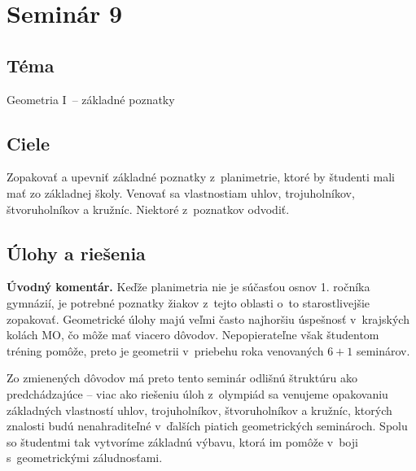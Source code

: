 \section*{Seminár 9}


\subsection*{Téma}
Geometria I~-- základné poznatky
\subsection*{Ciele}
Zopakovať a upevniť základné poznatky z~planimetrie, ktoré by študenti mali mať zo základnej školy. Venovať sa vlastnostiam uhlov, trojuholníkov, štvoruholníkov a kružníc. Niektoré z~poznatkov odvodiť.

\subsection*{Úlohy a riešenia}
\textbf{Úvodný komentár.} Keďže planimetria nie je súčasťou osnov 1. ročníka gymnázií, je potrebné poznatky žiakov z~tejto oblasti o~to starostlivejšie zopakovať. Geometrické úlohy majú veľmi často najhoršiu úspešnosť v~krajských kolách MO, čo môže mať viacero dôvodov. Nepopierateľne však študentom tréning pomôže, preto je geometrii v~priebehu roka venovaných $6+1$ seminárov.

Zo zmienených dôvodov má preto tento seminár odlišnú štruktúru ako predchádzajúce -- viac ako riešeniu úloh z~olympiád sa venujeme opakovaniu základných vlastností uhlov, trojuholníkov, štvoruholníkov a kružníc, ktorých znalosti budú nenahraditeľné v~ďalších piatich geometrických seminároch. Spolu so študentmi tak vytvoríme základnú výbavu, ktorá im pomôže v~boji s~geometrickými záludnosťami.

